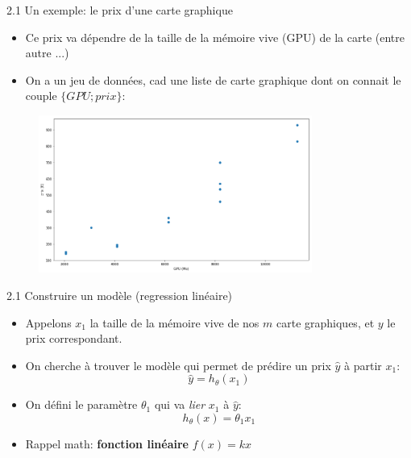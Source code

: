 \begin{frame}{2.1 Un exemple: le prix d'une carte graphique}
  \begin{itemize}
  \item Ce prix va dépendre de la taille de la mémoire vive (GPU) de la carte (entre autre ...)
    \vspace{0.2cm}
  \item On a un jeu de données, cad une liste de carte graphique dont on connait le couple $\{GPU;prix\}$:
  \end{itemize}

  \begin{figure}
    \includegraphics[width=0.8\textwidth]{fig/gpuPrices.png}    
  \end{figure}
\end{frame}

\begin{frame}{2.1 Construire un modèle (regression linéaire)}
  \begin{itemize}
  \item Appelons $x_{1}$ la taille de la mémoire vive de nos $m$ carte graphiques, et $y$ le prix correspondant.
    \vspace{0.2cm}
  \item On cherche à trouver le modèle qui permet de prédire un prix $\hat{y}$ à partir $x_{1}$:
    \begin{equation*}
      \hat{y} = h_{\theta}(x_{1})
    \end{equation*}
  \item On défini le paramètre $\theta_{1}$ qui va \textit{lier} $x_{1}$ à $\hat{y}$:
    \begin{equation*}
      h_{\theta}(x) = \theta_{1} x_{1}
    \end{equation*}
  \item Rappel math: \textbf{fonction linéaire} $f(x) = kx$
  \end{itemize}
\end{frame}

